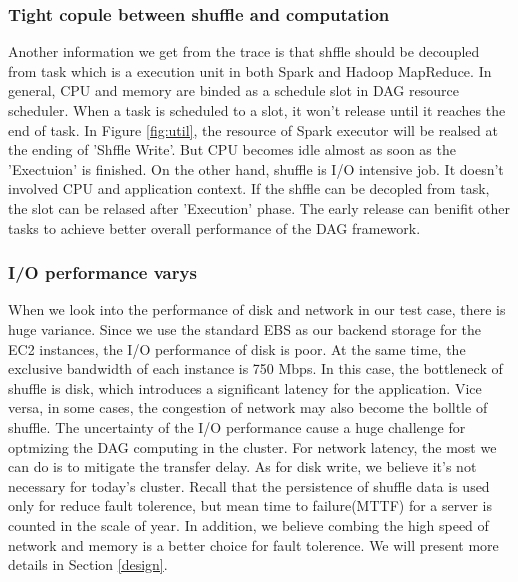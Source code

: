 \documentclass[10pt,twocolumn]{article}
\begin{document}
\subsubsection{Tight copule between shuffle and computation}
Another information we get from the trace is that shffle should be decoupled from task which is a execution unit in both Spark and Hadoop MapReduce. In general, CPU and memory are binded as a schedule slot in DAG resource scheduler. When a task is scheduled to a slot, it won't release until it reaches the end of task. In Figure \ref{fig:util}, the resource of Spark executor will be realsed at the ending of 'Shffle Write'.
But CPU becomes idle almost as soon as the 'Exectuion' is finished. On the other hand, shuffle is I/O intensive job. It doesn't involved CPU and application context. If the shffle can be decopled from task, the slot can be relased after 'Execution' phase. The early release can benifit other tasks to achieve better overall performance of the DAG framework.

\subsubsection{I/O performance varys}
When we look into the performance of disk and network in our test case, there is huge variance. Since we use the standard EBS as our backend storage for the EC2 instances, the I/O performance of disk is poor. 
At the same time, the exclusive bandwidth of each instance is 750 Mbps\cite{aws}. In this case, the bottleneck of shuffle is disk, which introduces a significant latency for the application. Vice versa, in some cases, the congestion of network may also become the bolltle of shuffle\cite{varys}. The uncertainty of the I/O performance cause a huge challenge for optmizing the DAG computing in the cluster. For network latency, the most we can do is to mitigate the transfer delay. As for disk write, we believe it's not necessary for today's cluster. Recall that the persistence of shuffle data is used only for reduce fault tolerence, but mean time to failure(MTTF) for a server is counted in the scale of year\cite{tachyon}. In addition, we believe combing the high speed of network and memory is a better choice for fault tolerence. We will present more details in Section \ref{design}.
\end{document}
